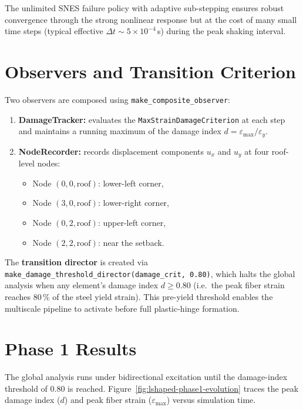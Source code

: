 The unlimited SNES failure policy with adaptive sub-stepping ensures
robust convergence through the strong nonlinear response but at the cost
of many small time steps (typical effective $\Delta t \sim 5 \times 10^{-4}$\,s)
during the peak shaking interval.


\section{Observers and Transition Criterion}
\label{sec:lshaped-observers}

Two observers are composed using \texttt{make\_composite\_observer}:

\begin{enumerate}
  \item \textbf{DamageTracker:} evaluates the
        \texttt{MaxStrainDamageCriterion} at each step and maintains a
        running maximum of the damage index
        $d = \varepsilon_{\max} / \varepsilon_y$.
  \item \textbf{NodeRecorder:} records displacement components $u_x$ and
        $u_y$ at four roof-level nodes:
        \begin{itemize}
          \item Node $(0, 0, \text{roof})$: lower-left corner,
          \item Node $(3, 0, \text{roof})$: lower-right corner,
          \item Node $(0, 2, \text{roof})$: upper-left corner,
          \item Node $(2, 2, \text{roof})$: near the setback.
        \end{itemize}
\end{enumerate}

The \textbf{transition director} is created via
\texttt{make\_damage\_threshold\_director(damage\_crit, 0.80)},
which halts the global analysis when any element's damage index
$d \ge 0.80$ (i.e.\ the peak fiber strain reaches 80\,\% of
the steel yield strain).  This pre-yield threshold enables the
multiscale pipeline to activate before full plastic-hinge formation.


\section{Phase 1 Results}
\label{sec:lshaped-phase1}

The global analysis runs under bidirectional excitation until the
damage-index threshold of 0.80 is reached.  Figure~\ref{fig:lshaped-phase1-evolution}
traces the peak damage index ($d$) and peak fiber strain ($\varepsilon_{\max}$)
versus simulation time.

